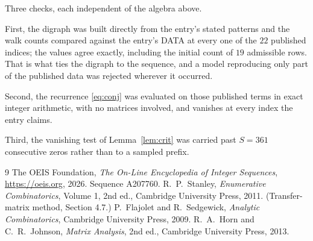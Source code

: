 \documentclass[11pt,a4paper]{article}
\theoremstyle{plain}
\theoremstyle{definition}
\begin{document}
Three checks, each independent of the algebra above.

First, the digraph was built directly from the entry's stated patterns and the walk counts
compared against the entry's DATA at every one of the $22$ published indices; the
values agree exactly, including the initial count of $19$ admissible rows. That is
what ties the digraph to the sequence, and a model reproducing only part of the published
data was rejected wherever it occurred.

Second, the recurrence \eqref{eq:conj} was evaluated on those published terms in exact
integer arithmetic, with no matrices involved, and vanishes at every index the entry claims.

Third, the vanishing test of Lemma~\ref{lem:crit} was carried past $S=361$ consecutive
zeros rather than to a sampled prefix.

\begin{thebibliography}{9}
 The OEIS Foundation, \emph{The On-Line Encyclopedia of Integer
Sequences}, \url{https://oeis.org}, 2026. Sequence A207760.
 R.~P.~Stanley, \emph{Enumerative Combinatorics}, Volume 1, 2nd ed.,
Cambridge University Press, 2011. (Transfer-matrix method, Section 4.7.)
 P.~Flajolet and R.~Sedgewick, \emph{Analytic Combinatorics}, Cambridge
University Press, 2009.
 R.~A.~Horn and C.~R.~Johnson, \emph{Matrix Analysis}, 2nd ed., Cambridge
University Press, 2013.
\end{thebibliography}
\end{document}

